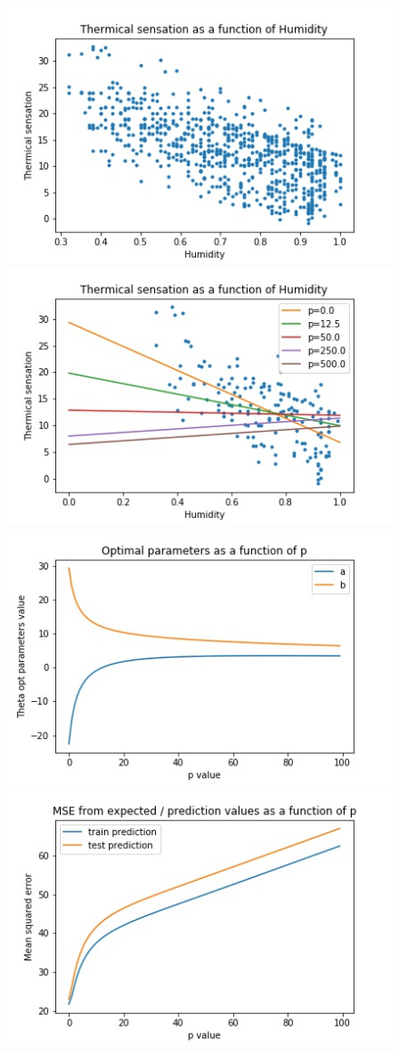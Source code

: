 \documentclass{article}
\begin{document}
\begin{figure}[h]
  \centering
  \includegraphics[scale = 0.45]{img/graph_base.jpg}
  \includegraphics[scale = 0.45]{img/graph_funcp.jpg}
  \includegraphics[scale = 0.45]{img/graph_opt_params.jpg}
  \includegraphics[scale = 0.45]{img/graph_MSE.jpg}

\end{figure}
\end{document}
